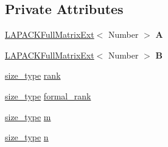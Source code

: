 \subsection*{Private Attributes}
\begin{DoxyCompactItemize}
\item 
\mbox{\label{classRkMatrix_a7bad017da4b56bfe703ac9086fd97d99}} 
\hyperlink{classLAPACKFullMatrixExt}{L\+A\+P\+A\+C\+K\+Full\+Matrix\+Ext}$<$ Number $>$ {\bfseries A}
\item 
\mbox{\label{classRkMatrix_a04f480fcd16ab9918271c7ba199df523}} 
\hyperlink{classLAPACKFullMatrixExt}{L\+A\+P\+A\+C\+K\+Full\+Matrix\+Ext}$<$ Number $>$ {\bfseries B}
\item 
\hyperlink{classRkMatrix_add060bfc3a4cc77f858c3d6dd58cadd5}{size\+\_\+type} \hyperlink{classRkMatrix_aa9e60bb24bbe3ab1750f970f296d8256}{rank}
\item 
\hyperlink{classRkMatrix_add060bfc3a4cc77f858c3d6dd58cadd5}{size\+\_\+type} \hyperlink{classRkMatrix_a7e4a8f0500daba627665c6a5ed8888d9}{formal\+\_\+rank}
\item 
\hyperlink{classRkMatrix_add060bfc3a4cc77f858c3d6dd58cadd5}{size\+\_\+type} \hyperlink{classRkMatrix_a8ca8898bcfedeee135437833f83b144c}{m}
\item 
\hyperlink{classRkMatrix_add060bfc3a4cc77f858c3d6dd58cadd5}{size\+\_\+type} \hyperlink{classRkMatrix_a06d3b6636bb423c391c66e4ccc722687}{n}
\end{DoxyCompactItemize}
